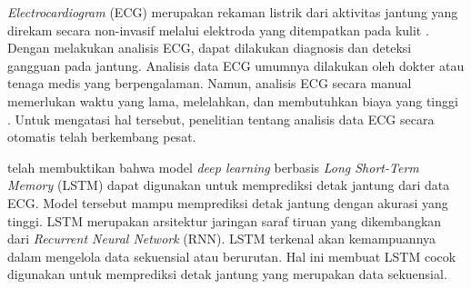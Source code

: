 \textit{Electrocardiogram} (ECG) merupakan rekaman listrik dari aktivitas jantung yang direkam secara non-invasif melalui elektroda yang ditempatkan pada kulit \parencite{sattarElectrocardiogram2024}.
Dengan melakukan analisis ECG, dapat dilakukan diagnosis dan deteksi gangguan pada jantung.
Analisis data ECG umumnya dilakukan oleh dokter atau tenaga medis yang berpengalaman.
Namun, analisis ECG secara manual memerlukan waktu yang lama, melelahkan, dan membutuhkan biaya yang tinggi \parencite{anbalaganAnalysisVariousTechniques2023}.
Untuk mengatasi hal tersebut, penelitian tentang analisis data ECG secara otomatis telah berkembang pesat.


\textcite{shchetininArrhythmiaDetectionUsing2022} telah membuktikan bahwa model \textit{deep learning} berbasis \emph{Long Short-Term Memory} (LSTM) dapat digunakan untuk memprediksi detak jantung dari data ECG.
Model tersebut mampu memprediksi detak jantung dengan akurasi yang tinggi.
LSTM merupakan arsitektur jaringan saraf tiruan yang dikembangkan dari \emph{Recurrent Neural Network} (RNN).
LSTM terkenal akan kemampuannya dalam mengelola data sekuensial atau berurutan.
Hal ini membuat LSTM cocok digunakan untuk memprediksi detak jantung yang merupakan data sekuensial.


